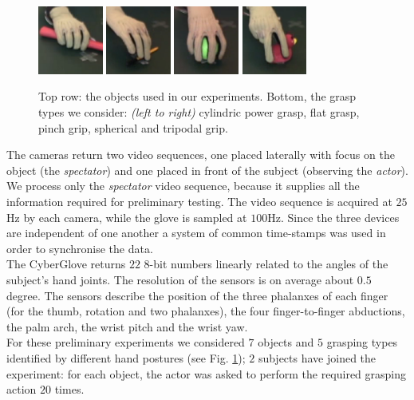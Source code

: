 \begin{figure}[h!]
	\includegraphics[width=0.19\textwidth]{images/flat}
	\includegraphics[width=0.19\textwidth]{images/pinch}
	\includegraphics[width=0.19\textwidth]{images/spherical}
	\includegraphics[width=0.19\textwidth]{images/tripodal}
	\caption{Top row: the objects used in our experiments. Bottom, the grasp types we consider: \emph{(left to right)} cylindric power grasp, flat grasp, pinch grip, spherical and
	tripodal grip.}
	\label{fig::grasps}
\end{figure}

The cameras return two video sequences, one placed laterally with focus on the object (the \emph{spectator}) and one placed in front of the subject (observing the \emph{actor}). We process only the {\em spectator} video sequence, because it supplies all the information required for preliminary testing. The video sequence is acquired at $25$Hz by each camera, while the glove is sampled at $100$Hz. Since the three devices are independent of one another a system of common time-stamps was used in order to synchronise the data.\\
The CyberGlove returns $22$ $8$-bit numbers linearly related to the angles of the subject's hand joints. The resolution of the sensors is on average about $0.5$ degree. The sensors describe the position of the three phalanxes of each finger
(for the thumb, rotation and two phalanxes), the four finger-to-finger
abductions, the palm arch, the wrist pitch and the wrist yaw.\\
For these preliminary experiments we considered $7$ objects and $5$ grasping types identified by different hand postures (see Fig. \ref{fig::grasps}); $2$ subjects have joined the experiment: for each object, the actor was asked to perform the required grasping action $20$ times. 


